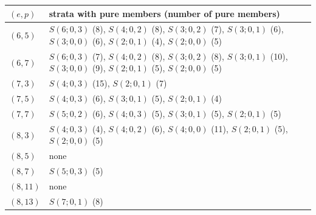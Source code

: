 \begin{tabular}{@{}l>{\raggedright\arraybackslash}p{11.2cm}@{}}
\toprule
$(e,p)$ & strata with pure members (number of pure members)\\
\midrule
$(6,5)$ & $S(6;0,3)$ (8), $S(4;0,2)$ (8), $S(3;0,2)$ (7), $S(3;0,1)$ (6), $S(3;0,0)$ (6), $S(2;0,1)$ (4), $S(2;0,0)$ (5)\\
$(6,7)$ & $S(6;0,3)$ (7), $S(4;0,2)$ (8), $S(3;0,2)$ (8), $S(3;0,1)$ (10), $S(3;0,0)$ (9), $S(2;0,1)$ (5), $S(2;0,0)$ (5)\\
$(7,3)$ & $S(4;0,3)$ (15), $S(2;0,1)$ (7)\\
$(7,5)$ & $S(4;0,3)$ (6), $S(3;0,1)$ (5), $S(2;0,1)$ (4)\\
$(7,7)$ & $S(5;0,2)$ (6), $S(4;0,3)$ (5), $S(3;0,1)$ (5), $S(2;0,1)$ (5)\\
$(8,3)$ & $S(4;0,3)$ (4), $S(4;0,2)$ (6), $S(4;0,0)$ (11), $S(2;0,1)$ (5), $S(2;0,0)$ (5)\\
$(8,5)$ & none\\
$(8,7)$ & $S(5;0,3)$ (5)\\
$(8,11)$ & none\\
$(8,13)$ & $S(7;0,1)$ (8)\\
\bottomrule
\end{tabular}
